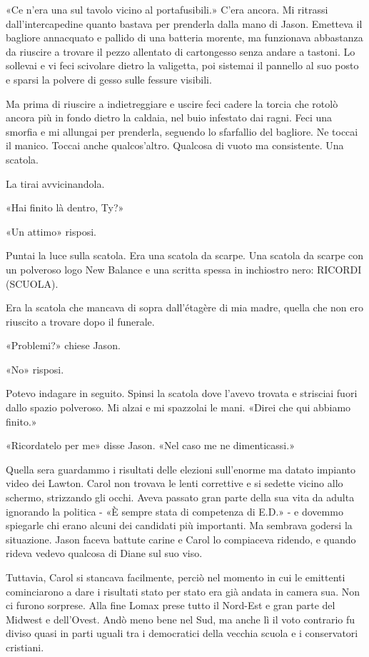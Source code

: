 «Ce n'era una sul tavolo vicino al portafusibili.» C'era ancora. Mi
ritrassi dall'intercapedine quanto bastava per prenderla dalla mano di
Jason. Emetteva il bagliore annacquato e pallido di una batteria
morente, ma funzionava abbastanza da riuscire a trovare il pezzo
allentato di cartongesso senza andare a tastoni. Lo sollevai e vi feci
scivolare dietro la valigetta, poi sistemai il pannello al suo posto e
sparsi la polvere di gesso sulle fessure visibili.

Ma prima di riuscire a indietreggiare e uscire feci cadere la torcia che
rotolò ancora più in fondo dietro la caldaia, nel buio infestato dai
ragni. Feci una smorfia e mi allungai per prenderla, seguendo lo
sfarfallio del bagliore. Ne toccai il manico. Toccai anche
qualcos'altro. Qualcosa di vuoto ma consistente. Una scatola.

La tirai avvicinandola.

«Hai finito là dentro, Ty?»

«Un attimo» risposi.

Puntai la luce sulla scatola. Era una scatola da scarpe. Una scatola da
scarpe con un polveroso logo New Balance e una scritta spessa in
inchiostro nero: {RICORDI} ({SCUOLA}).

Era la scatola che mancava di sopra dall'étagère di mia madre, quella
che non ero riuscito a trovare dopo il funerale.

«Problemi?» chiese Jason.

«No» risposi.

Potevo indagare in seguito. Spinsi la scatola dove l'avevo trovata e
strisciai fuori dallo spazio polveroso. Mi alzai e mi spazzolai le mani.
«Direi che qui abbiamo finito.»

«Ricordatelo per me» disse Jason. «Nel caso me ne dimenticassi.»

\separatorefiori

Quella sera guardammo i risultati delle elezioni sull'enorme ma datato
impianto video dei Lawton. Carol non trovava le lenti correttive e si
sedette vicino allo schermo, strizzando gli occhi. Aveva passato gran
parte della sua vita da adulta ignorando la politica - «È sempre stata
di competenza di E.D.» - e dovemmo spiegarle chi erano alcuni dei
candidati più importanti. Ma sembrava godersi la situazione. Jason
faceva battute carine e Carol lo compiaceva ridendo, e quando rideva
vedevo qualcosa di Diane sul suo viso.

Tuttavia, Carol si stancava facilmente, perciò nel momento in cui le
emittenti cominciarono a dare i risultati stato per stato era già andata
in camera sua. Non ci furono sorprese. Alla fine Lomax prese tutto il
Nord-Est e gran parte del Midwest e dell'Ovest. Andò meno bene nel Sud,
ma anche lì il voto contrario fu diviso quasi in parti uguali tra i
democratici della vecchia scuola e i conservatori cristiani.

